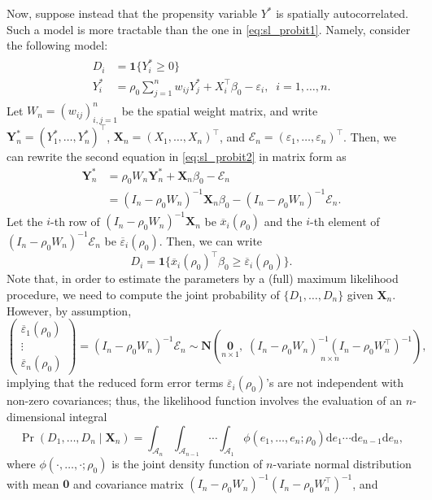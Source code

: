 \documentclass[10.5pt, A4paper, openany, uplatex]{book}
\newcommand{\mbf}{\mathbf}
\newcommand{\mcl}{\mathcal}
\newcommand{\mrm}{\mathrm}
\newcommand{\eps}{\varepsilon}
\renewcommand{\bar}{\overline}
\numberwithin{equation}{section}
\begin{document}
Now, suppose instead that the propensity variable $Y^*$ is spatially autocorrelated.
Such a model is more tractable than the one in \eqref{eq:sl_probit1}.
Namely, consider the following model:
\begin{align}\label{eq:sl_probit2}
\begin{split}
	D_i & = \mathbf{1}\{Y^*_i \geq 0\}\\
	Y^*_i & = \rho_0 \sum_{j = 1}^n w_{ij} Y^*_j + X_i^\top \beta_0 - \eps_i, \;\;  i =1 , \ldots, n.
\end{split}
\end{align}
Let $W_n = (w_{ij})_{i,j = 1}^n$ be the spatial weight matrix, and write $\mbf{Y}^*_n = (Y^*_1, \ldots, Y^*_n)^\top$, $\mbf{X}_n = (X_1, \ldots , X_n)^\top$, and $\mcl{E}_n = (\eps_1, \ldots , \eps_n)^\top$.
Then, we can rewrite the second equation in \eqref{eq:sl_probit2} in matrix form as
\begin{align*}
	\mbf{Y}^*_n 
	& =  \rho_0 W_n \mbf{Y}^*_n + \mbf{X}_n \beta_0 - \mcl{E}_n \\
	& = (I_n - \rho_0 W_n)^{-1}\mbf{X}_n \beta_0 - (I_n - \rho_0 W_n)^{-1}\mcl{E}_n.
\end{align*}
Let the $i$-th row of $(I_n - \rho_0 W_n)^{-1}\mbf{X}_n $ be $\bar x_i(\rho_0)$ and the $i$-th element of $(I_n - \rho_0 W_n)^{-1}\mcl{E}_n$ be $\bar \eps_i(\rho_0)$.
Then, we can write
\[
	D_i = \mbf{1}\{\bar x_i(\rho_0)^\top \beta_0 \geq  \bar \eps_i(\rho_0)\}.
\]
Note that, in order to estimate the parameters by a (full) maximum likelihood procedure, we need to compute the joint probability of $\{ D_1, \ldots , D_n \}$ given $\mbf{X}_n$.
However, by assumption,
\[
	\left( \begin{array}{c}
	\bar \eps_1(\rho_0) \\
	\vdots \\
	\bar \eps_n(\rho_0)
	\end{array} \right) = (I_n - \rho_0 W_n)^{-1}\mcl{E}_n \sim \mbf{N}\left(\underset{n \times 1}{\mbf{0}}, \; \underset{n \times n}{(I_n - \rho_0 W_n)^{-1}(I_n - \rho_0 W_n^\top)^{-1}}\right),
\]
implying that the reduced form error terms $\bar \eps_i(\rho_0)$'s are not independent with non-zero covariances; thus, the likelihood function involves the evaluation of an $n$-dimensional integral
\[
	\Pr(D_1, \ldots , D_n \mid \mbf{X}_n) = \int_{\mcl{A}_n} \int_{\mcl{A}_{n-1}} \cdots \int_{\mcl{A}_1} \phi(e_1, \ldots, e_n; \rho_0) \mrm{d}e_1 \cdots \mrm{d}e_{n-1}\mrm{d}e_n,
\]
where $\phi(\cdot, \ldots, \cdot; \rho_0)$ is the joint density function of $n$-variate normal distribution with mean $\mbf{0}$ and covariance matrix $(I_n - \rho_0 W_n)^{-1}(I_n - \rho_0 W_n^\top)^{-1}$, and
\end{document}
